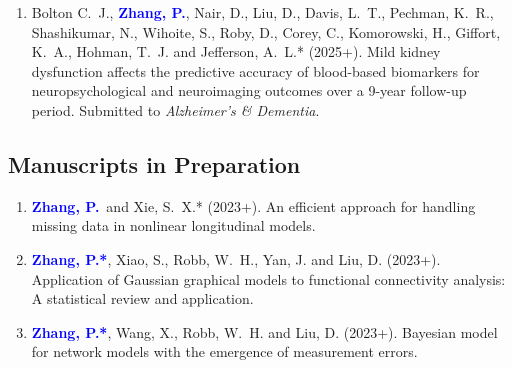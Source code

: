 \documentclass[12pt]{article}
\newcommand{\PZ}{\textcolor{blue}{\textbf{Zhang, P.*}}}
\newcommand{\PZnot}{\textcolor{blue}{\textbf{Zhang, P.}}}
\begin{document}
\begin{enumerate}
		\item {\sc Bolton C.\ J.,} \PZnot, {\sc Nair, D., Liu, D., 
		Davis, L.\ T., Pechman, K.\ R., Shashikumar, N., Wihoite, S., 
		Roby, D., Corey, C., Komorowski, H., Giffort, K.\ A., Hohman, 
		T.\ J.} and {\sc Jefferson, A.\ L.*} (2025+). Mild kidney 
		dysfunction affects the predictive accuracy of blood-based 
		biomarkers for neuropsychological and neuroimaging outcomes 
		over a 9-year follow-up period. Submitted to {\em Alzheimer's 
		\& Dementia}.
	\end{enumerate}
	
	\subsection*{Manuscripts in Preparation}
	\begin{enumerate}
		\item \PZnot\ and {\sc Xie, S.\ X.*} (2023+). An efficient 
		approach for handling missing data in nonlinear longitudinal
		models.	
		
		\item \PZ, {\sc Xiao, S., Robb, W.\ H., Yan, J.} and {\sc 
		Liu, D.} (2023+).
		Application of Gaussian graphical models to functional 
		connectivity analysis: A statistical review and application.
		
		\item \PZ, {\sc Wang, X., Robb, W.\ H.} and {\sc Liu, D.} 
		(2023+). Bayesian model for network models with the 
		emergence of measurement errors.
	\end{enumerate}
	
\end{document}
